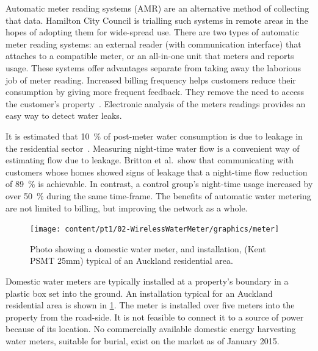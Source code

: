   Automatic meter reading systems (AMR) are an alternative method of collecting that data.
  Hamilton City Council is trialling such systems in remote areas in the hopes of adopting them for wide-spread use.
  There are two types of automatic meter reading systems:
  an external reader (with communication interface) that attaches to a compatible meter, or an all-in-one unit that meters and reports usage.
  These systems offer advantages separate from taking away the laborious job of meter reading.
  Increased billing frequency helps customers reduce their consumption by giving more frequent feedback.
  They remove the need to access the customer's property~\cite{Chang2012}.
  Electronic analysis of the meters readings provides an easy way to detect water leaks.

  It is estimated that \SI{10}{\percent} of post-meter water consumption is due to leakage in the residential sector~\cite{Britton2013}.
  Measuring night-time water flow is a convenient way of estimating flow due to leakage.
  Britton et al.\ show that communicating with customers whose homes showed signs of leakage that a night-time flow reduction of \SI{89}{\percent} is achievable.
  In contrast, a control group's night-time usage increased by over \SI{50}{\percent} during the same time-frame.
  The benefits of automatic water metering are not limited to billing, but improving the network as a whole.

  \begin{figure}
    \centering
    \texttt{[image: content/pt1/02-WirelessWaterMeter/graphics/meter]}
    \caption{\label{fig:Photo_DomesticWaterMeter}Photo showing a domestic water meter, and installation, (Kent PSMT 25mm) typical of an Auckland residential area.}
  \end{figure}
  Domestic water meters are typically installed at a property's boundary in a plastic box set into the ground.
  An installation typical for an Auckland residential area is shown in \cref{fig:Photo_DomesticWaterMeter}.
  The meter is installed over five meters into the property from the road-side.
  It is not feasible to connect it to a source of power because of its location.
  No commercially available domestic energy harvesting water meters, suitable for burial, exist on the market as of January 2015.

